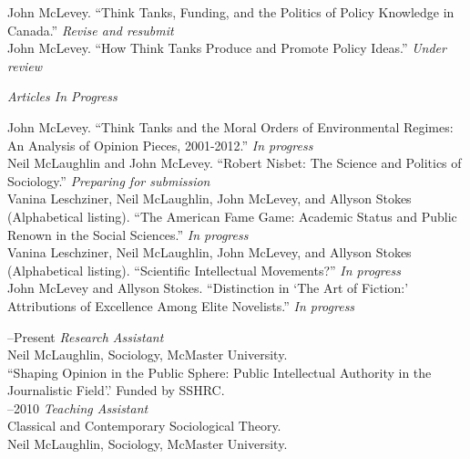 \documentclass[11pt,usenames,dvipsnames]{article}
\begin{document}
\ind John McLevey. ``Think Tanks, Funding, and the Politics of Policy Knowledge in Canada.'' \emph{Revise and resubmit}\\

\ind John McLevey. ``How Think Tanks Produce and Promote Policy Ideas.'' \emph{Under review}\\


\noindent\emph{Articles In Progress \vspace{0.01in}}

\ind John McLevey. ``Think Tanks and the Moral Orders of Environmental Regimes: An Analysis of Opinion Pieces, 2001-2012.'' \emph{In progress} \\

\ind Neil McLaughlin and John McLevey. ``Robert Nisbet: The Science and Politics of Sociology.'' \emph{Preparing for submission} \\

\ind Vanina Leschziner, Neil McLaughlin, John McLevey, and Allyson Stokes (Alphabetical listing). ``The American Fame Game: Academic Status and Public Renown in the Social Sciences.'' \emph{In progress} \\

\ind Vanina Leschziner, Neil McLaughlin, John McLevey, and Allyson Stokes (Alphabetical listing). ``Scientific Intellectual Movements?'' \emph{In progress} \\

\ind John McLevey and Allyson Stokes. ``Distinction in `The Art of Fiction:' Attributions of Excellence Among Elite Novelists.'' \emph{In progress} \\



–Present {\it Research Assistant}\\
Neil McLaughlin, Sociology, McMaster University.\\ 
``Shaping Opinion in the Public Sphere: Public Intellectual Authority in the Journalistic Field'.' Funded by SSHRC.\\

–2010 {\it Teaching Assistant}\\
Classical and Contemporary Sociological Theory.\\
Neil McLaughlin, Sociology, McMaster University.\\
\end{document}
